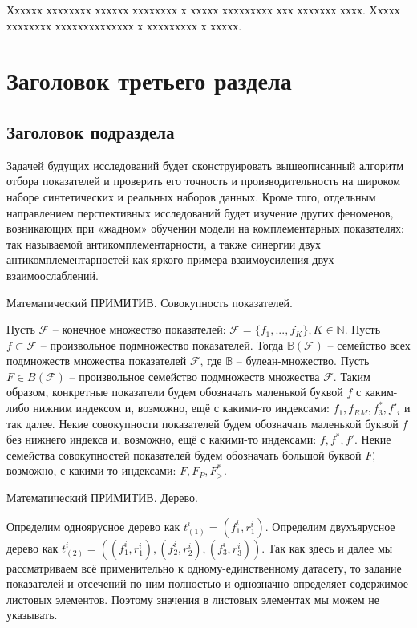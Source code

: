 \documentclass[12pt]{a&t}
\begin{document}
Хххххх хххххххх хххххх хххххххх х ххххх ххххххххх ххх ххххххх хххх.
Ххххх хххххххх хххххххххххххх х ххххххххх х ххххх.


\section{Заголовок третьего раздела}

\subsection{Заголовок подраздела}

Задачей будущих исследований будет сконструировать вышеописанный алгоритм отбора показателей и проверить его точность и производительность на широком наборе синтетических и реальных наборов данных. Кроме того, отдельным направлением перспективных исследований будет изучение других феноменов, возникающих при «жадном» обучении модели на комплементарных показателях: так называемой антикомплементарности, а также синергии двух антикомплементарностей как яркого примера взаимоусиления двух взаимоослаблений.

Математический ПРИМИТИВ. Совокупность показателей.

Пусть $\mathscr{F}$ -- конечное множество показателей: $\mathscr{F} = \{f_1, ..., f_K \}, K\in\mathbb{N}$. Пусть $f \subset \mathscr{F}$ -- произвольное подмножество показателей. Тогда $\mathbb{B} (\mathscr{F})$ -- семейство всех подмножеств множества показателей $\mathscr{F}$, где $\mathbb{B}$ -- булеан-множество. Пусть $F \in B(\mathscr{F})$ -- произвольное семейство подмножеств множества $\mathscr{F}$. Таким образом, конкретные показатели будем обозначать маленькой буквой $f$ с каким-либо нижним индексом и, возможно, ещё с какими-то индексами: $f_1, f_{RM}, f^*_3, f'_i$ и так далее. Некие совокупности показателей будем обозначать маленькой буквой $f$ без нижнего индекса и, возможно, ещё с какими-то индексами: $f, f^*, f'$. Некие семейства совокупностей показателей будем обозначать большой буквой $F$, возможно, с какими-то индексами: $F, F_P, F^*_>$. 

Математический ПРИМИТИВ. Дерево. 

Определим одноярусное дерево как $t_{(1)}^i = (f_1^i, r_1^i)$. Определим двухъярусное дерево как $t_{(2)}^i = ((f_1^i, r_1^i), (f_2^i, r_2^i), (f_3^i, r_3^i)) $. Так как здесь и далее мы рассматриваем всё применительно к одному-единственному датасету, то задание показателей и отсечений по ним полностью и однозначно определяет содержимое листовых элементов. Поэтому значения в листовых элементах мы можем не указывать. 
\end{document}
